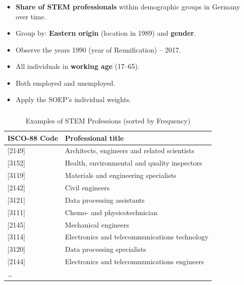 \documentclass[11pt, aspectratio=1610, xcolor={dvipsnames}]{beamer}
\newcommand{\highlight}[1]{\textbf{\textcolor{PineGreen}{#1}}}
\begin{document}
	\begin{frame}
		\frametitle{}
		
		\begin{itemize}
			\item \highlight{Share of STEM professionals} within demographic groups in Germany over time.
			\item Group by: \highlight{Eastern origin} (location in 1989) and \highlight{gender}.
			\item Observe the years 1990 (year of Reunification) -- 2017.
			\item All individuals in \highlight{working age} (17--65).
			\item Both employed and unemployed.
			\item Apply the SOEP's individual weights.
		\end{itemize}
		
	\end{frame}
	
	\begin{frame}
		\frametitle{}
		
		{\linespread{1}\small
			\begin{table}[h]
				\centering
				\caption{Examples of STEM Professions (sorted by Frequency)}
				\label{tab:stem_examples}
				
				\begin{tabular}{ll}
					\toprule
					ISCO-88 Code & Professional title\\
					\midrule
					{[2149]} & Architects, engineers and related scientists\\
					{[3152]} & Health, environmental and quality inspectors\\
					{[3119]} & Materials and engineering specialists\\
					{[2142]} & Civil engineers\\
					{[3121]} & Data processing assistants\\
					{[3111]} & Chemo- and physicotechnician\\
					{[2145]} & Mechanical engineers\\
					{[3114]} & Electronics and telecommunications technology\\
					{[3120]} & Data processing specialists\\
					{[2144]} & Electronics and telecommunications engineers\\
					… &\\
					\bottomrule
				\end{tabular}
			\end{table}
		}
		
	\end{frame}
	
\end{document}
